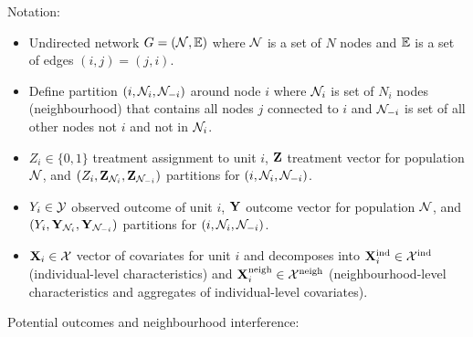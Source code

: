 \documentclass[10pt]{article}
\begin{document}
Notation:
\begin{itemize}

\item
Undirected network $G=(\mathcal{N},\mathbb{E})$ where $\mathcal{N}$ is a set of $N$ nodes and $\mathbb{E}$ is a set of edges $(i,j)=(j,i)$.

\item
Define partition $(i,\mathcal{N}_i,\mathcal{N}_{-i})$ around node $i$ where $\mathcal{N}_i$ is set of $N_i$ nodes (neighbourhood) that contains all nodes $j$ connected to $i$ and $\mathcal{N}_{-i}$ is set of all other nodes not $i$ and not in $\mathcal{N}_i$.

\item
$Z_i\in\{0,1\}$ treatment assignment to unit $i$, $\mathbf{Z}$ treatment vector for population $\mathcal{N}$, and $(Z_i,\mathbf{Z}_{\mathcal{N}_i},\mathbf{Z}_{\mathcal{N}_{-i}})$ partitions for $(i,\mathcal{N}_i,\mathcal{N}_{-i})$.

\item
$Y_i\in\mathcal{Y}$ observed outcome of unit $i$, $\mathbf{Y}$ outcome vector for population $\mathcal{N}$, and $(Y_i,\mathbf{Y}_{\mathcal{N}_i},\mathbf{Y}_{\mathcal{N}_{-i}})$ partitions for $(i,\mathcal{N}_i,\mathcal{N}_{-i})$.

\item
$\mathbf{X}_i\in\mathcal{X}$ vector of covariates for unit $i$ and decomposes into $\mathbf{X}^{\text{ind}}_i\in\mathcal{X}^\text{ind}$ (individual-level characteristics) and $\mathbf{X}^{\text{neigh}}_i\in\mathcal{X}^\text{neigh}$ (neighbourhood-level characteristics and aggregates of individual-level covariates).

\end{itemize}

Potential outcomes and neighbourhood interference:
\end{document}
